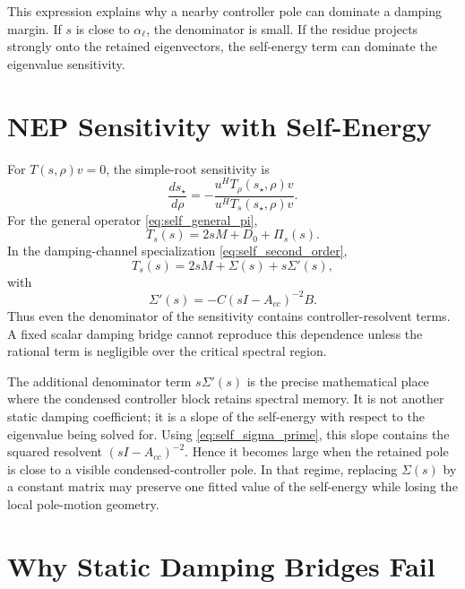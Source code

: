 This expression explains why a nearby controller pole can dominate a damping
margin. If \(s\) is close to \(\alpha_\ell\), the denominator is small. If the
residue projects strongly onto the retained eigenvectors, the self-energy term
can dominate the eigenvalue sensitivity.

\section{NEP Sensitivity with Self-Energy}

For \(T(s,\rho)v=0\), the simple-root sensitivity is
\begin{equation}
  \frac{ds_\star}{d\rho}
  =
  -\frac{u^H T_\rho(s_\star,\rho)v}
  {u^H T_s(s_\star,\rho)v}.
  \label{eq:self_nep_sens}
\end{equation}
For the general operator \eqref{eq:self_general_pi},
\begin{equation}
  T_s(s)=2sM+D_0+\Pi_s(s).
  \label{eq:self_Ts_general}
\end{equation}
In the damping-channel specialization \eqref{eq:self_second_order},
\begin{equation}
  T_s(s)=2sM+\Sigma(s)+s\Sigma'(s),
  \label{eq:self_Ts}
\end{equation}
with
\begin{equation}
  \Sigma'(s)=-C(sI-A_{cc})^{-2}B.
  \label{eq:self_sigma_prime}
\end{equation}
Thus even the denominator of the sensitivity contains controller-resolvent
terms. A fixed scalar damping bridge cannot reproduce this dependence unless
the rational term is negligible over the critical spectral region.

The additional denominator term \(s\Sigma'(s)\) is the precise mathematical
place where the condensed controller block retains spectral memory. It is not
another static damping coefficient; it is a slope of the self-energy with
respect to the eigenvalue being solved for. Using
\eqref{eq:self_sigma_prime}, this slope contains the squared resolvent
\((sI-A_{cc})^{-2}\). Hence it becomes large when the retained pole is close to
a visible condensed-controller pole. In that regime, replacing
\(\Sigma(s)\) by a constant matrix may preserve one fitted value of the
self-energy while losing the local pole-motion geometry.

\section{Why Static Damping Bridges Fail}

